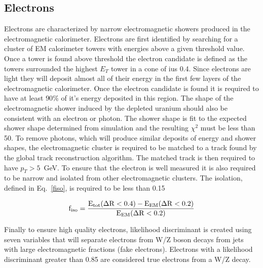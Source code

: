 \subsection{Electrons}
Electrons are characterized by narrow electromagnetic showers produced in the electromagnetic calorimeter. Electrons are first identified by searching for a cluster of EM calorimeter towers with energies above a given threshold value. Once a tower is found above threshold the electron candidate is defined as the towers surrounded the highest $E_{T}$ tower in a cone of ius 0.4. Since electrons are light they will deposit almost all of their energy in the first few layers of the electromagnetic calorimeter. Once the electron candidate is found it is required to have at least $90\%$ of it's energy deposited in this region. The shape of the electromagnetic shower induced by the depleted uranium should also be consistent with an electron or photon. The shower shape is fit to the expected shower shape determined from simulation and the resulting $\chi^{2}$ must be less than 50. To remove photons, which will produce similar deposits of energy and shower shapes, the electromagnetic cluster is required to be matched to a track found by the global track reconstruction algorithm. The matched track is then required to have $p_{T}>5$~GeV. To ensure that the electron is well measured it is also required to be narrow and isolated from other electromagnetic clusters. The isolation, defined in Eq.~\ref{fiso}, is required to be less than 0.15

\begin{equation}
\label{fiso}
\rm{f_{iso}} = \frac{E_{tot}(\Delta R <  0.4) - E_{EM}(\Delta R <  0.2)}{E_{EM}(\Delta R <  0.2)}
\end{equation}

Finally to ensure high quality electrons, likelihood discriminant is created using seven variables that will separate electrons from W/Z boson decays from jets with large electromagnetic fractions (fake electrons). Electrons with a likelihood discriminant greater than 0.85 are considered true electrons from a W/Z decay.

